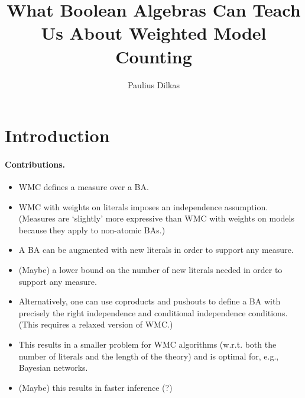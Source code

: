 \documentclass{article}
\title{What Boolean Algebras Can Teach Us About Weighted Model Counting}
\author{Paulius Dilkas}
\theoremstyle{definition}
\theoremstyle{remark}
\begin{document}
\maketitle

\section{Introduction}




\paragraph{Contributions.}
\begin{itemize}
\item WMC defines a measure over a BA.
\item WMC with weights on literals imposes an independence assumption. (Measures
  are `slightly' more expressive than WMC with weights on models because they
  apply to non-atomic BAs.)
\item A BA can be augmented with new literals in order to support any measure.
\item (Maybe) a lower bound on the number of new literals needed in order to
  support any measure.
\item Alternatively, one can use coproducts and pushouts to define a BA with
  precisely the right independence and conditional independence conditions.
  (This requires a relaxed version of WMC.)
\item This results in a smaller problem for WMC algorithms (w.r.t. both the
  number of literals and the length of the theory) and is optimal for, e.g.,
  Bayesian networks.
\item (Maybe) this results in faster inference (?)
\end{itemize}
\end{document}
